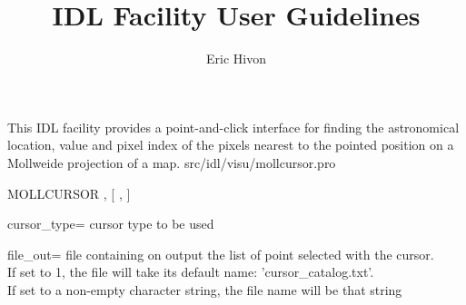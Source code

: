 




\sloppy



\title{\healpix IDL Facility User Guidelines}
 \section[mollcursor]{ }
\label{idl:\thedocid}
\author{Eric Hivon}




\begin{facility}
{This IDL facility provides a point-and-click interface for finding
the astronomical location, value and pixel index of the pixels nearest 
to the pointed position on a Mollweide projection of a \healpix map.}
{src/idl/visu/mollcursor.pro}
\end{facility}


\begin{IDLformat}
{{MOLLCURSOR}%
, [%
, %
]}
\end{IDLformat}

\begin{qualifiers}
  \begin{qulist}{} %
 	\item[{cursor\_type=}]  cursor type to be used \\
 	\item[{file\_out=}]  file containing on output the list of
 	point selected with the cursor. \\
	If set to 1, the file will
 	take its default name: 'cursor\_catalog.txt'. \\
	If set to a non-empty character string, the file name will be that string
  \end{qulist}
\end{qualifiers}

